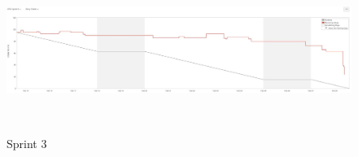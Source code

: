 \begin{figure}[h]
        \centering
        \includegraphics[width = 1\textwidth]{VAPIQ-PICTURES/BDSprint3}
        \caption{Sprint 3}
        \\[2.0 cm]
    \end{figure}
  

